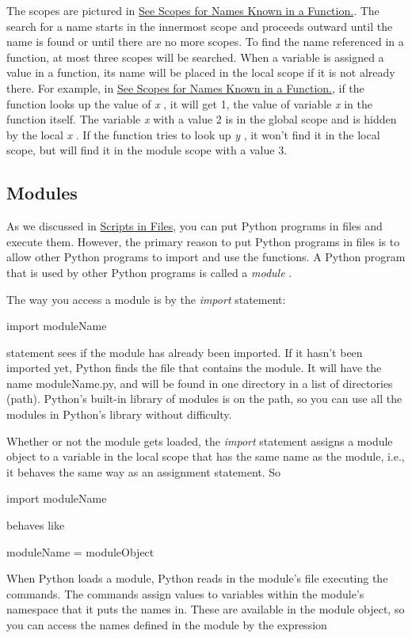 The scopes are pictured in
\href{chap2.html\#83458}{See Scopes for Names Known in a Function.}. The
search for a name starts in the innermost scope and proceeds outward
until the name is found or until there are no more scopes. To find the
name referenced in a function, at most three scopes will be searched.
When a variable is assigned a value in a function, its name will be
placed in the local scope if it is not already there. For example, in
\href{chap2.html\#83458}{See Scopes for Names Known in a Function.}, if
the function looks up the value of \emph{x} , it will get 1, the value
of variable \emph{x} in the function itself. The variable \emph{x} with
a value 2 is in the global scope and is hidden by the local \emph{x} .
If the function tries to look up \emph{y} , it won't find it in the
local scope, but will find it in the module scope with a value 3.


\subsection{Modules}

As we discussed in
\href{chap2.html\#30113}{Scripts in Files}, you can put Python programs
in files and execute them. However, the primary reason to put Python
programs in files is to allow other Python programs to import and use
the functions. A Python program that is used by other Python programs is
called a \emph{module} .

The way you access a module is by
the \emph{import} statement:

import moduleName

 statement sees if
the module has already been imported. If it hasn't been imported yet,
Python finds the file that contains the module. It will have the name
moduleName.py, and will be found in one directory in a list of
directories (path). Python's built-in library of modules is on the path,
so you can use all the modules in Python's library without difficulty.

Whether or not the module gets
loaded, the \emph{import} statement assigns a module object to a
variable in the local scope that has the same name as the module, i.e.,
it behaves the same way as an assignment statement. So

import moduleName

behaves like

moduleName = moduleObject

When Python loads a module, Python
reads in the module's file executing the commands. The commands assign
values to variables within the module's namespace that it puts the names
in. These are available in the module object, so you can access the
names defined in the module by the expression

